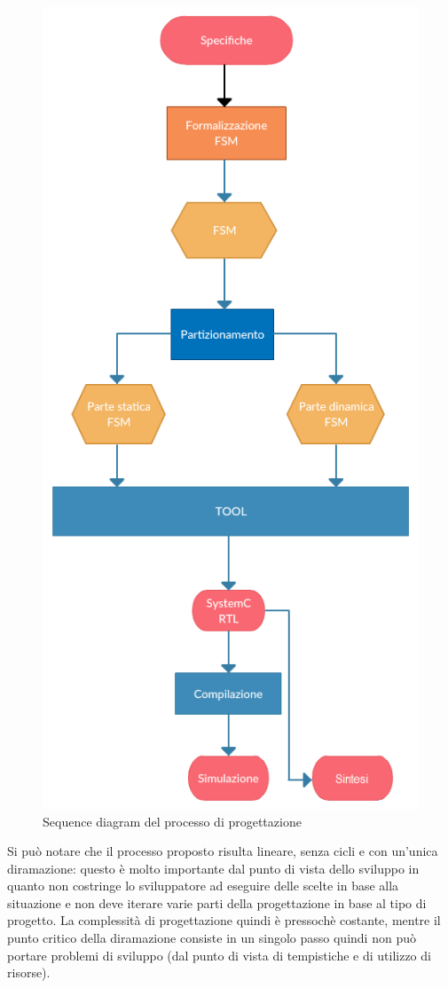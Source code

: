 \documentclass[a4paper,titlepage]{book}
\begin{document}
\begin{figure}[!hb]
\centering
\includegraphics[scale=0.75]{processo.png}
\caption{Sequence diagram del processo di progettazione}\label{fig:7}
\end{figure}

Si può notare che il processo proposto risulta lineare, senza cicli e con un'unica diramazione: questo è molto importante dal punto di vista dello sviluppo in quanto non costringe lo sviluppatore ad eseguire delle scelte in base alla situazione e non deve iterare varie parti della progettazione in base al tipo di progetto. La complessità di progettazione quindi è pressochè costante, mentre il punto critico della diramazione consiste in un singolo passo quindi non può portare problemi di sviluppo (dal punto di vista di tempistiche e di utilizzo di risorse).
\end{document}
